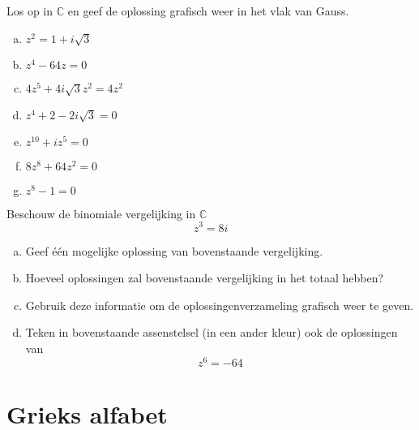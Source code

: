\documentclass[12pt,twoside,a4paper]{article}
\begin{document}
\begin{oefening}
Los op in $\mathbb{C}$ en geef de oplossing grafisch weer in het vlak van Gauss.
\begin{multicols}{2}
\begin{enumerate}[(a)]
  \itemsep.5em
  \item $\displaystyle z^2=1+i\sqrt{3}$
  \item $\displaystyle z^4-64z = 0$
  \item $\displaystyle 4z^5+4i\sqrt{3}z^2=4z^2$
  \item $\displaystyle z^4+2-2i\sqrt{3}=0$
  \item $\displaystyle z^{10}+iz^5=0$
  \item $\displaystyle 8z^8+64z^2=0$
  \item $\displaystyle z^8-1=0$
\end{enumerate}
\end{multicols}

\begin{oefening}
  Beschouw de binomiale vergelijking in $\mathbb{C}$
$$z^3=8i$$
\begin{enumerate}[(a)]
\item Geef één mogelijke oplossing van bovenstaande vergelijking.
\item Hoeveel oplossingen zal bovenstaande vergelijking in het totaal hebben?
\item Gebruik deze informatie om de oplossingenverzameling grafisch weer te geven.
\item Teken in bovenstaande assenstelsel (in een ander kleur) ook de oplossingen van
  $$z^6=-64$$
\end{enumerate}
\end{oefening}

\end{oefening}

\appendix
\cleardoublepage
\section{Grieks alfabet}
\end{document}
